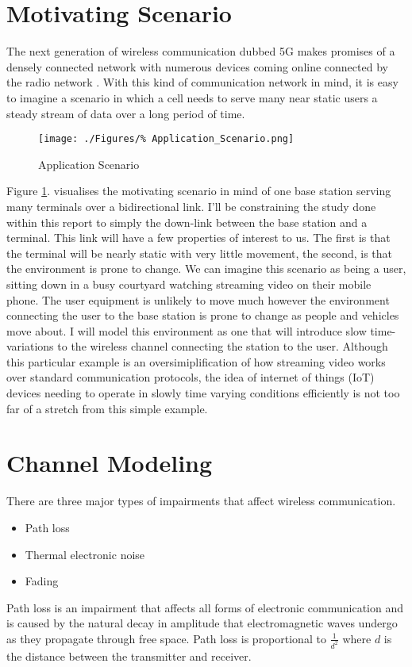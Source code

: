 \section{Motivating Scenario}
\label{sec:MotivatingScenario}
The next generation of wireless communication %
dubbed 5G makes promises of a densely connected %
network with numerous devices coming online %
connected by the radio network \cite{Demestichas13,Hossain15}. %
With this kind of communication network in mind, it is easy %
to imagine a scenario in which a cell needs %
to serve many near static users a steady stream %
of data over a long period of time.%
\begin{figure}[h!]
	\texttt{[image: ./Figures/\%
	Application\_Scenario.png]}
	\caption{Application Scenario}
	\label{fig:AppScene}
\end{figure}
Figure \ref{fig:AppScene}. visualises the motivating %
scenario in mind of one base station serving many %
terminals over a bidirectional link. I'll be constraining %
the study done within this report to simply the down-link %
between the base station and a terminal. This link will %
have a few properties of interest to us. The first is that %
the terminal will be nearly static with very little movement, %
the second, is that the environment is prone to change. We can %
imagine this scenario as being a user, sitting down in a busy %
courtyard watching streaming video on their mobile phone. The %
user equipment is unlikely to move much however the environment %
connecting the user to the base station is prone to change as %
people and vehicles move about. I will model this environment %
as one that will introduce slow time-variations to the wireless %
channel connecting the station to the user. Although this %
particular example is an oversimiplification of how streaming %
video works over standard communication protocols, the idea %
of internet of things (IoT) devices needing to operate in %
slowly time varying conditions efficiently is not too far %
of a stretch from this simple example.

\section{Channel Modeling}

There are three major types of impairments that affect %
wireless communication.
\begin{itemize}
	\item{Path loss}
	\item{Thermal electronic noise}
	\item{Fading}
\end{itemize}
Path loss is an impairment that affects %
all forms of electronic communication and is %
caused by the natural decay in amplitude %
that electromagnetic waves undergo as they %
propagate through free space. Path loss %
is proportional to $\frac{1}{d^2}$ where %
$d$ is the distance between the transmitter %
and receiver.

